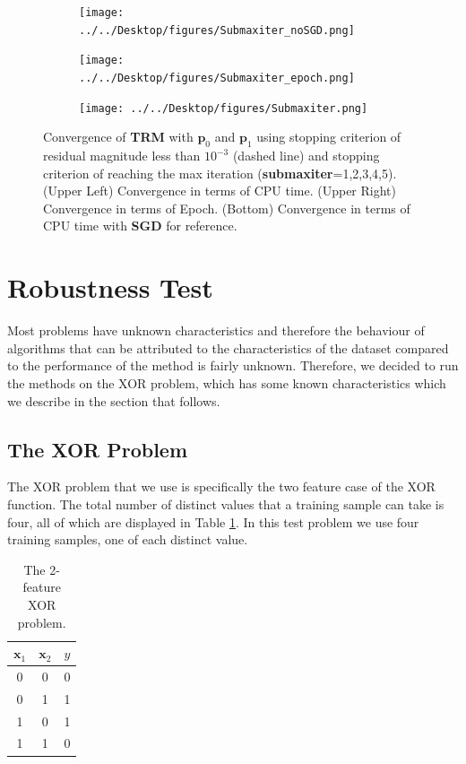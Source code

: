 \documentclass[letterpaper,12pt,titlepage,oneside,final]{book}
\begin{document}
	
	\begin{figure}
		\centering
		\begin{subfigure}{.49\textwidth}
			\texttt{[image: ../../Desktop/figures/Submaxiter\_noSGD.png]}
		\end{subfigure}
		\begin{subfigure}{.49\textwidth}
			\texttt{[image: ../../Desktop/figures/Submaxiter\_epoch.png]}
		\end{subfigure}
		\begin{subfigure}{.5\textwidth}
			\texttt{[image: ../../Desktop/figures/Submaxiter.png]}
		\end{subfigure}
		\caption{Convergence of \textbf{TRM} with $\mathbf{p}_{0}$ and $\mathbf{p}_{1}$ using stopping criterion of residual magnitude less than $10^{-3}$ (dashed line) and stopping criterion of reaching the max iteration (\textbf{submaxiter}=1,2,3,4,5). (Upper Left) Convergence in terms of CPU time. (Upper Right) Convergence in terms of Epoch. (Bottom) Convergence in terms of CPU time with \textbf{SGD} for reference.}
		\label{figure:mnist_maxiter}
	\end{figure}
	
	\section{Robustness Test} 
	
	Most problems have unknown characteristics and therefore the behaviour of algorithms that can be attributed to the characteristics of the dataset compared to the performance of the method is fairly unknown. Therefore, we decided to run the methods on the XOR problem, which has some known characteristics which we describe in the section that follows. 
	
	\subsection{The XOR Problem}
	
	The XOR problem that we use is specifically the two feature case of the XOR function. The total number of distinct values that a training sample can take is four, all of which are displayed in Table \ref{table:XOR}. In this test problem we use four training samples, one of each distinct value.
	
	\begin{table}[h] 
		\centering 
		\begin{tabular}{ |c|c||c| } 
			\hline 
			$\mathbf{x}_{1}$ & $\mathbf{x}_{2}$ & $y$\\ 
			\hline
			\hline
			0 & 0 & 0\\ 
			\hline 
			0 & 1 & 1\\ 
			\hline 
			1 & 0 & 1\\ 
			\hline 
			1 & 1 & 0\\ 
			\hline 
		\end{tabular} 
		\caption{The 2-feature XOR problem.} \label{table:XOR} \end{table}
	
\end{document}
